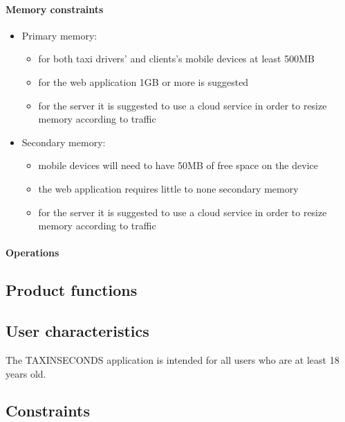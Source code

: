 \documentclass{article}
\begin{document}
\paragraph{Memory constraints} 
\begin{itemize}
	\item Primary memory:
		\begin{itemize}
			\item for both taxi drivers' and clients's mobile devices at least 500MB 
			\item for the web application 1GB or more is suggested
			\item for the server it is suggested to use a cloud service in order to resize memory according to traffic
		\end{itemize}
	\item Secondary memory:
		\begin{itemize}
			\item mobile devices will need to have 50MB of free space on the device
			\item the web application requires little to none secondary memory %
			\item for the server it is suggested to use a cloud service in order to resize memory according to traffic
		\end{itemize}
\end{itemize}
\paragraph{Operations} 

\subsection{Product functions}
\subsection{User characteristics}
The TAXINSECONDS application is intended for all users who are at least 18 years old.
\subsection{Constraints}
\end{document}
